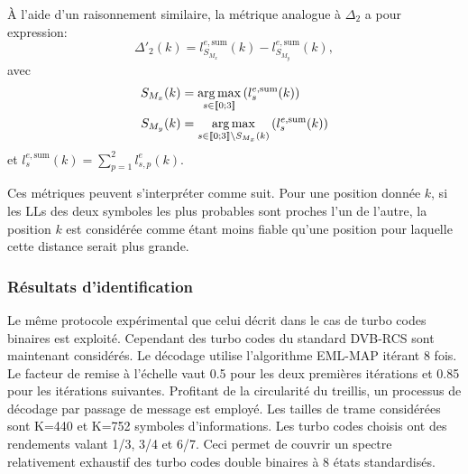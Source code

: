 À l'aide d'un raisonnement similaire, la métrique analogue à $\Delta_2$ a pour expression: 
\begin{equation}
	\Delta'_2(k) = l^{e,\text{sum}}_{S_{M_x}}(k)-l^{e,\text{sum}}_{S_{M_y}}(k),
\end{equation}
avec
\begin{align*}
S_{M_x}(k) &= \operatorname*{arg\,max}\limits_{s\in\llbracket0;3\rrbracket}\left(l^{e,\text{sum}}_s(k)\right) \\
S_{M_y}(k) &= \operatorname*{arg\,max}\limits_{s\in\llbracket0;3\rrbracket\setminus{S_{M_x}(k)}}\left(l^{e,\text{sum}}_s(k)\right)
\end{align*}
et $l^{e,\text{sum}}_s(k) = \sum\limits_{p=1}^2l^e_{s,p}(k)$.

Ces métriques peuvent s'interpréter comme suit. Pour une position donnée $k$, si les LLs des deux symboles les 
plus probables sont proches l'un de l'autre, la position $k$ est considérée comme étant moins fiable qu'une position pour
laquelle cette distance serait plus grande.

\subsubsection{Résultats d'identification}
Le même protocole expérimental que celui décrit dans le cas de turbo codes binaires est exploité. Cependant des turbo codes du standard DVB-RCS
sont maintenant considérés. Le décodage utilise l'algorithme EML-MAP itérant 8 fois. Le facteur de remise à l'échelle 
vaut 0.5 pour les deux premières itérations et 0.85 pour les itérations suivantes. Profitant de la circularité du treillis, 
un processus de décodage par passage de message est employé. Les tailles de trame considérées sont K=440
et K=752 symboles d'informations. Les turbo codes choisis ont des rendements valant 1/3, 3/4 et 6/7. Ceci permet de 
couvrir un spectre relativement exhaustif des turbo codes double binaires à 8 états standardisés. 

